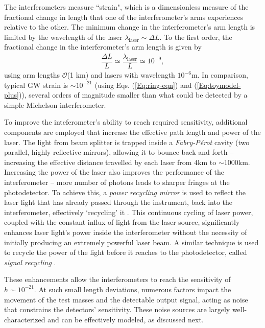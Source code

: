 The interferometers measure ``strain", which is a dimensionless measure of the fractional change in length that one of the interferometer's arms experiences relative to the other. The minimum change in the interferometer's arm length is limited by the wavelength of the laser $\lambda_{\text{laser}} \sim \Delta L$. To the first order, the fractional change in the interferometer’s arm length is given by
\begin{align}
    \dfrac{\Delta L}{L} \simeq \dfrac{\lambda_{\text{laser}}}{L} \simeq 10^{-9}, 
    \label{Eq:rough-strain-sensitivity}
\end{align}
using arm lengths $\mathcal{O}$(1 km) and lasers with wavelength $10^{-6}$m. In comparison,  typical GW strain is $\sim 10^{-21}$ (using Eqs. (\ref{Eq:ring-eqn}) and (\ref{Eq:toymodel-plus})), several orders of magnitude smaller than what could be detected by a simple Michelson interferometer.  

To improve the inteferometer's ability to reach required sensitivity, additional components are employed that increase the effective path length and power of the laser. The light from beam splitter is trapped inside a \textit{Fabry-P\'erot} \cite{Maggiore:2008aaa} cavity (two parallel, highly reflective mirrors), allowing it to bounce back and forth -- increasing the effective distance travelled by each laser from $4$km to $\sim 1000$km. Increasing the power of the laser also improves the performance of the interferometer -- more number of photons leads to sharper fringes at the photodetector. To achieve this, a \textit{power recycling mirror} is used to reflect the laser light that has already passed through the instrument, back into the interferometer, effectively `recycling' it \cite{Meers:1988wp}. This continuous cycling of laser power, coupled with the constant influx of light from the laser source, significantly enhances laser light's power inside the interferometer without the necessity of initially producing an extremely powerful laser beam. A similar technique is used to recycle the power of the light before it reaches to the photodetector, called \textit{signal recycling} \cite{Buonanno:2001cj}. 

These enhancements allow the interferometers to reach the sensitivity of $h \sim 10^{-21}$. At such small length deviations, numerous factors impact the movement of the test masses and the detectable output signal, acting as noise that constrains the detectors' sensitivity. These noise sources are largely well-characterized and can be effectively modeled, as discussed next. 

